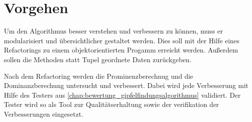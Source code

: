 \section{Vorgehen} \label{sec:vorgehen_optimierung}
Um den Algorithmus besser verstehen und verbessern zu können, muss er modularisiert und übersichtlicher gestaltet werden. Dies soll mit der Hilfe eines Refactorings zu einem objektorientierten Progamm erreicht werden. Außerdem sollen die Methoden statt Tupel geordnete Daten zurückgeben. 

Nach dem Refactoring werden die Prominenzberechnug und die Dominanzberechung untersucht und verbessert. Dabei wird jede Verbesserung mit Hilfe des Testers aus \ref{chap:bewertung_gipfelfindungsalgorithmus} validiert. Der Tester wird so als Tool zur Qualitätserhaltung sowie der verifikation der Verbesserungen eingesetzt. 
